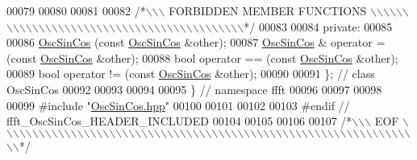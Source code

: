 \begin{DoxyCode}
00079 
00080 
00081 
00082 \textcolor{comment}{/*\(\backslash\)\(\backslash\)\(\backslash\) FORBIDDEN MEMBER FUNCTIONS \(\backslash\)\(\backslash\)\(\backslash\)\(\backslash\)\(\backslash\)\(\backslash\)\(\backslash\)\(\backslash\)\(\backslash\)\(\backslash\)\(\backslash\)\(\backslash\)\(\backslash\)\(\backslash\)\(\backslash\)\(\backslash\)\(\backslash\)\(\backslash\)\(\backslash\)\(\backslash\)\(\backslash\)\(\backslash\)\(\backslash\)\(\backslash\)\(\backslash\)\(\backslash\)\(\backslash\)\(\backslash\)\(\backslash\)\(\backslash\)\(\backslash\)\(\backslash\)\(\backslash\)\(\backslash\)\(\backslash\)\(\backslash\)\(\backslash\)\(\backslash\)\(\backslash\)\(\backslash\)\(\backslash\)\(\backslash\)\(\backslash\)*/}
00083 
00084 \textcolor{keyword}{private}:
00085 
00086                         \hyperlink{a00020_aed332791021f51d86b05594629244f1e}{OscSinCos} (\textcolor{keyword}{const} \hyperlink{a00020}{OscSinCos} &other);
00087     \hyperlink{a00020}{OscSinCos} &        operator = (\textcolor{keyword}{const} \hyperlink{a00020}{OscSinCos} &other);
00088     \textcolor{keywordtype}{bool}                operator == (\textcolor{keyword}{const} \hyperlink{a00020}{OscSinCos} &other);
00089     \textcolor{keywordtype}{bool}                operator != (\textcolor{keyword}{const} \hyperlink{a00020}{OscSinCos} &other);
00090 
00091 \};  \textcolor{comment}{// class OscSinCos}
00092 
00093 
00094 
00095 \}   \textcolor{comment}{// namespace ffft}
00096 
00097 
00098 
00099 \textcolor{preprocessor}{#include    "\hyperlink{a00112}{OscSinCos.hpp}"}
00100 
00101 
00102 
00103 \textcolor{preprocessor}{#endif  // ffft\_OscSinCos\_HEADER\_INCLUDED}
00104 
00105 
00106 
00107 \textcolor{comment}{/*\(\backslash\)\(\backslash\)\(\backslash\) EOF \(\backslash\)\(\backslash\)\(\backslash\)\(\backslash\)\(\backslash\)\(\backslash\)\(\backslash\)\(\backslash\)\(\backslash\)\(\backslash\)\(\backslash\)\(\backslash\)\(\backslash\)\(\backslash\)\(\backslash\)\(\backslash\)\(\backslash\)\(\backslash\)\(\backslash\)\(\backslash\)\(\backslash\)\(\backslash\)\(\backslash\)\(\backslash\)\(\backslash\)\(\backslash\)\(\backslash\)\(\backslash\)\(\backslash\)\(\backslash\)\(\backslash\)\(\backslash\)\(\backslash\)\(\backslash\)\(\backslash\)\(\backslash\)\(\backslash\)\(\backslash\)\(\backslash\)\(\backslash\)\(\backslash\)\(\backslash\)\(\backslash\)\(\backslash\)\(\backslash\)\(\backslash\)\(\backslash\)\(\backslash\)\(\backslash\)\(\backslash\)\(\backslash\)\(\backslash\)\(\backslash\)\(\backslash\)\(\backslash\)\(\backslash\)\(\backslash\)\(\backslash\)\(\backslash\)\(\backslash\)\(\backslash\)\(\backslash\)\(\backslash\)\(\backslash\)\(\backslash\)\(\backslash\)*/}
\end{DoxyCode}
